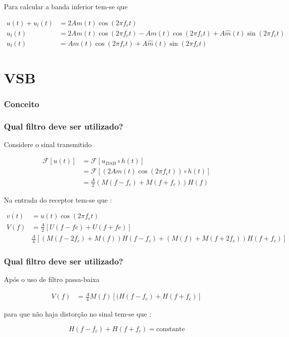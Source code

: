 \documentclass[10pt,hyperref={pdfpagemode=FullScreen},aspectratio=169]{beamer}
\begin{document}
\begin{frame}
  \frametitle{}

  Para calcular a banda inferior tem-se que 


\begin{align*}
u(t) + u_l(t) &= 2Am(t)\cos(2\pi f_ct)  \\
u_l(t)        &= 2Am(t)\cos(2\pi f_ct) - A m(t)\cos( 2 \pi f_c t) + A\hat{m}(t)\sin( 2 \pi f_c t) \\
u_l(t)        &= A m(t)\cos( 2 \pi f_c t) + A\hat{m}(t)\sin( 2 \pi f_c t)
\end{align*}

\end{frame}

\section{VSB}
\begin{frame}
  \frametitle{Conceito}


  

\end{frame}


\begin{frame}
  \frametitle{Qual filtro deve ser utilizado?}

  Considere o sinal transmitido

\begin{align*}
 \mathcal{F}[u(t)] & = \mathcal{F}[u_{DSB} \circ h(t)]  \\
                   & = \mathcal{F}[(2Am(t)\cos(2\pi f_ct)) \circ h(t)] \\
                   & = \frac{A}{2}(M(f-f_c) + M(f+f_c))H(f)
\end{align*}

Na entrada do receptor tem-se que :

\begin{align*}
v(t)     &= u(t) \cos(2\pi f_ct)  \\
V(f)     & =\frac{A}{2} [U(f - fc) + U(f + fc)] \\
         &  \frac{A}{4}\left[(M(f-2f_c) + M(f))H(f-f_c) +  (M(f) + M(f+2f_c))H(f+f_c) \right]
\end{align*}

\end{frame}


\begin{frame}
  \frametitle{Qual filtro deve ser utilizado?}

  
Após o uso de filtro passa-baixa

\begin{align*}
V(f)     & =  \frac{A}{4}M(f)\left[(H(f-f_c) + H(f+f_c) \right]
\end{align*}

para que não haja distorção no sinal tem-se que :

$$
H(f-f_c) + H(f+f_c) = \textrm{constante}
$$
\end{frame}
\end{document}
